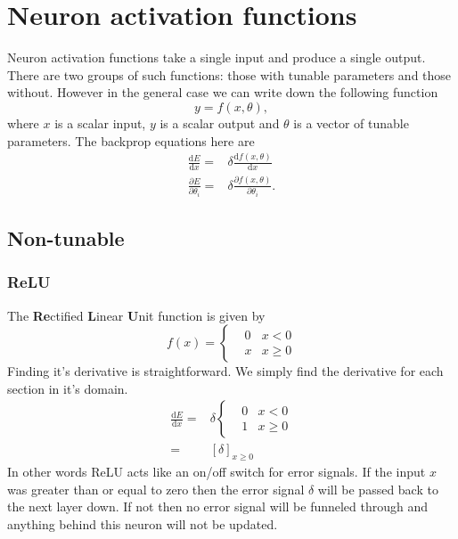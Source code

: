 \documentclass[a4paper]{article}
\begin{document}
\section{Neuron activation functions}
Neuron activation functions take a single input and produce a single output. There are two groups of such functions: those with tunable parameters and those without. However in the general case we can write down the following function
\begin{equation}
y = f(x,\theta),
\end{equation}
where $x$ is a scalar input, $y$ is a scalar output and $\theta$ is a vector of tunable parameters. The backprop equations here are 
\begin{align}
\frac{\mathrm{d} E }{\mathrm{d} x} = & \delta \frac{\mathrm{d} f(x,\theta)}{\mathrm{d} x}\\
\frac{\partial E }{\partial \theta_i} = & \delta \frac{\partial f(x,\theta)}{\partial \theta_i}.
\end{align}

\subsection{Non-tunable}
\subsubsection{ReLU}
The {\bf Re}ctified {\bf L}inear {\bf U}nit function is given by
\begin{equation}
f(x)=\left\{\begin{matrix}
 & 0 & x< 0\\ 
 & x & x \geq 0
\end{matrix}\right.
\end{equation}
Finding it's derivative is straightforward. We simply find the derivative for each section in it's domain.
\begin{align}
\frac{\mathrm{d} E }{\mathrm{d} x}= &
\delta \left\{\begin{matrix}
 & 0 & x< 0\\ 
 & 1 & x \geq 0
\end{matrix}\right. \\
= & \left [ \delta \right ]_{x \geq 0}
\end{align}
In other words ReLU acts like an on/off switch for error signals. If the input $x$ was greater than or equal to zero then the error signal $\delta$ will be passed back to the next layer down. If not then no error signal will be funneled through and anything behind this neuron will not be updated. 
\end{document}
